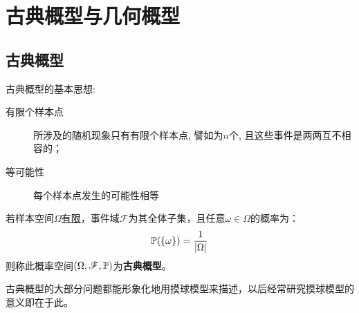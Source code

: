 



\section{古典概型与几何概型}

\subsection{古典概型}

古典概型的基本思想:
\begin{description}
    \item[有限个样本点] 所涉及的随机现象只有有限个样本点, 譬如为$n$个, 且这些事件是两两互不相容的；
    \item[等可能性] 每个样本点发生的可能性相等
\end{description}

\begin{definition}[古典概型]
    若样本空间$\Omega$\underline{有限}，事件域$\mathscr{F}$为其全体子集，且任意$\omega \in \Omega$的概率为：
    \[ \P(\{ \omega \} ) = \frac1{\abs{\Omega}} \]
    则称此概率空间$(\Omega,\mathscr{F},\P)$为\textbf{古典概型}。
\end{definition}
\begin{note}
    古典概型的大部分问题都能形象化地用摸球模型来描述，以后经常研究摸球模型的意义即在于此。
\end{note}

